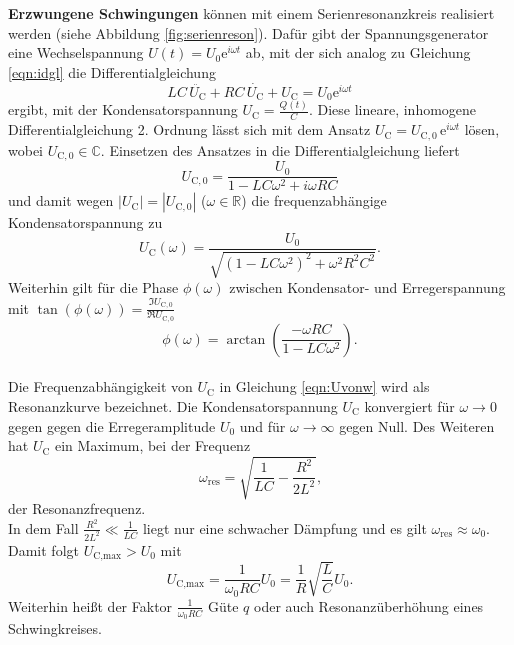 \textbf{Erzwungene Schwingungen} können mit einem Serienresonanzkreis realisiert werden (siehe
Abbildung \ref{fig:serienreson}).
Dafür gibt der Spannungsgenerator eine Wechselspannung $U(t) = U_0 \mathrm{e}^{i \omega t}$
ab, mit der sich analog zu Gleichung \eqref{eqn:idgl} die Differentialgleichung
\begin{equation}
	LC \, \ddot{U_{\text{C}}} + RC \, \dot{U_{\text{C}}} + U_{\text{C}} = U_0 \mathrm{e}^{i \omega t}
\end{equation}
ergibt, mit der Kondensatorspannung $U_{\text{C}} = \frac{Q(t)}{C}$.
Diese lineare, inhomogene Differentialgleichung 2. Ordnung lässt sich mit dem Ansatz
$U_{\text{C}} = U_{\text{C},0} \, \mathrm{e}^{i \omega t}$ lösen, wobei
$U_{\text{C},0} \in \mathbb{C}$.
Einsetzen des Ansatzes in die Differentialgleichung liefert
\begin{equation}
	U_{\text{C},0} = \frac{U_0}{1-LC \omega^2 + i\omega RC}
\end{equation}
und damit wegen $|U_{\text{C}}| = |U_{\text{C},0}|$ ($\omega \in \mathbb{R}$)
die frequenzabhängige Kondensatorspannung zu
\begin{equation}
	\label{eqn:Uvonw}
	U_{\text{C}}(\omega) = \frac{U_0}{\sqrt{(1-LC \omega^2)^2 + \omega^2 R^2 C^2}} \text{.}
\end{equation}
Weiterhin gilt für die Phase $\phi(\omega)$ zwischen Kondensator- und Erregerspannung
mit $\tan(\phi(\omega)) = \frac{\Im U_{\text{C},0}}{\Re U_{\text{C},0}}$
\begin{equation}
	\phi(\omega) = \arctan(\frac{-\omega R C}{1 - L C \omega^2}) \text{.}
	\label{eqn:phivonw}
\end{equation}
\\
Die Frequenzabhängigkeit von $U_{\text{C}}$ in Gleichung \eqref{eqn:Uvonw} wird als
Resonanzkurve bezeichnet.
Die Kondensatorspannung $U_{\text{C}}$ konvergiert für $\omega \to 0$  gegen gegen die
Erregeramplitude $U_0$ und für $\omega \to \infty$ gegen Null.
Des Weiteren hat $U_{\text{C}}$ ein Maximum, bei der Frequenz
\begin{equation}
	\label{eqn:omega}
	\omega_{\text{res}} = \sqrt{\frac{1}{LC} - \frac{R^2}{2L^2}} \text{,}
\end{equation}
der Resonanzfrequenz.
\\
In dem Fall $\frac{R^2}{2L^2} \ll \frac{1}{LC}$ liegt nur eine schwacher Dämpfung und es gilt
$\omega_{\text{res}} \approx \omega_0$. Damit folgt $U_{\text{C,max}} > U_0$ mit
\begin{equation}
	U_{\text{C,max}} = \frac{1}{\omega_0 RC} U_0 = \frac{1}{R} \sqrt{\frac{L}{C}} U_0 \text{.}
	\label{eqn:guete}
\end{equation}
Weiterhin heißt der Faktor $\frac{1}{\omega_0 RC}$ Güte $q$ oder auch Resonanzüberhöhung eines
Schwingkreises.

